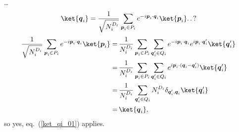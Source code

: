 \documentclass{report}
\begin{document}
\ldots 
\begin{align}
\begin{aligned}
	\ket{\boldsymbol{q}_i} = \frac{1}{\sqrt{N_i^{D_i}}} \sum_{\boldsymbol{p}_i\in P_i}
		e^{- i \boldsymbol{p}_i \cdot \boldsymbol{q}_i} \ket{\boldsymbol{p}_i} .\,.\,?
	\label{ket_qi_01}
\end{aligned}
\end{align} 
\begin{align}
\begin{aligned}
	\frac{1}{\sqrt{N_i^{D_i}}} \sum_{\boldsymbol{p}_i\in P_i}
		e^{- i \boldsymbol{p}_i \cdot \boldsymbol{q}_i} \ket{\boldsymbol{p}_i} =&\,
	\frac{1}{N_i^{D_i}} 
		\sum_{\boldsymbol{p}_i\in P_i} \sum_{\boldsymbol{q}_i'\in Q_i}
		e^{- i \boldsymbol{p}_i \cdot \boldsymbol{q}_i}
		e^{i \boldsymbol{p}_i \cdot \boldsymbol{q}_i'} 
		\ket{\boldsymbol{q}_i'} \\ 
	=&\,
	\frac{1}{N_i^{D_i}} 
		\sum_{\boldsymbol{p}_i\in P_i} \sum_{\boldsymbol{q}_i'\in Q_i}
		e^{i \boldsymbol{p}_i \cdot (\boldsymbol{q}_i - \boldsymbol{q}_i')}
		\ket{\boldsymbol{q}_i'} \\ 
	=&\,
	\frac{1}{N_i^{D_i}} 
		\sum_{\boldsymbol{q}_i'\in Q_i}
		N_i^{D_i}
		\delta_{\boldsymbol{q}_i', \boldsymbol{q}_i}
		\ket{\boldsymbol{q}_i'} \\
	=&\,
	\ket{\boldsymbol{q}_i},
\end{aligned}
\end{align} 
so yes, eq.\ (\ref{ket_qi_01}) applies. 
\end{document}
